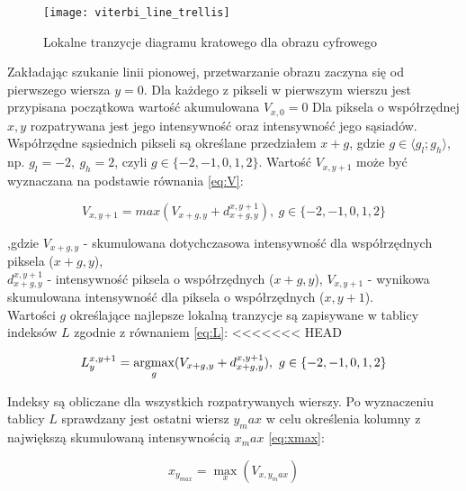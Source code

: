 \documentclass[document.tex]{subfiles}
\begin{document}
\begin{figure}[h]
\texttt{[image: viterbi\_line\_trellis]}
\caption{Lokalne tranzycje diagramu kratowego dla obrazu cyfrowego\protect\cite{Mazurek_Robot_Viterbi}}
\label{fig:viterbi_trellis}
\end{figure}

Zakładając szukanie linii pionowej, przetwarzanie obrazu zaczyna się od pierwszego wiersza $y = 0$. 
Dla każdego z pikseli w pierwszym wierszu jest przypisana początkowa wartość akumulowana $V_{x, 0} = 0$
Dla piksela o współrzędnej $x, y$ rozpatrywana jest jego intensywność oraz intensywność jego sąsiadów.
Współrzędne sąsiednich pikseli są określane przedziałem $x + g$, gdzie $g\in \langle g_l;g_h\rangle$, np. $g_l = -2,\ g_h = 2$, czyli $g\in \{-2, -1, 0, 1, 2\}$. Wartość $V_{x,y+1}$ może być wyznaczana na podstawie równania \ref{eq:V}\cite{Mazurek_Robot_Viterbi}\cite{viterbi_ch_6}:

\begin{equation}
    V_{x, y+1} = max(V_{x+g, y} + d_{x+g, y}^{x,y+1}),\ g\in\{-2,-1,0,1,2\}
    \label{eq:V}
\end{equation}


,gdzie $V_{x+g, y}$ - skumulowana dotychczasowa intensywność dla współrzędnych piksela ($x+g, y$), 
\\
$d_{x+g, y}^{x,y+1}$ - intensywność piksela o współrzędnych ($x+g, y$),  $V_{x, y+1}$ - wynikowa skumulowana intensywność dla piksela o współrzędnych (${x, y+1}$).
\\
Wartości $g$ określające najlepsze lokalną tranzycje są zapisywane w tablicy indeksów $L$ zgodnie z równaniem \ref{eq:L}\cite{Mazurek_Robot_Viterbi}\cite{viterbi_ch_6}:
<<<<<<< HEAD

\begin{equation}
   L_{y}^{x, y+1} = \argmax_{g}\limits(V_{x+g, y} + d_{x+g, y}^{x,y+1}),\ g\in\{-2,-1,0,1,2\}
    \label{eq:L}
\end{equation}

Indeksy są obliczane dla wszystkich rozpatrywanych wierszy. Po wyznaczeniu tablicy $L$ sprawdzany jest ostatni wiersz $y_max$ w celu określenia kolumny z największą skumulowaną intensywnością $x_max$ \ref{eq:xmax}:

\begin{equation}
   x_{y_{max}} = \max_{x}\limits(V_{x, y_max})
    \label{eq:xmax}
\end{equation}
\end{document}
